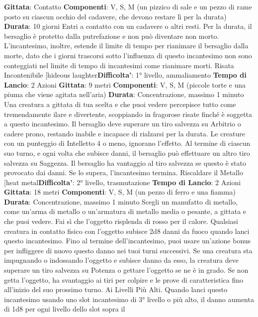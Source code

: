 \begin{multicols}{2}
\textbf{Gittata}: Contatto
\textbf{Componenti}: V, S, M (un pizzico di sale e un pezzo di
rame posto su ciascun occhio del cadavere, che
devono restare lì per la durata)
\textbf{Durata}: 10 giorni
Entri a contatto con un cadavere o altri resti. Per la
durata, il bersaglio è protetto dalla putrefazione e non
può diventare non morto.
L’incantesimo, inoltre, estende il limite di tempo per
rianimare il bersaglio dalla morte, dato che i giorni
trascorsi sotto l’influenza di questo incantesimo non 
sono conteggiati nel limite di tempo di incantesimi come
rianimare morti.
Risata Incontenibile
[hideous laughter\textbf{Difficolta'}:
1° livello, ammaliamento
\textbf{Tempo di Lancio}: 2 Azioni
\textbf{Gittata}: 9 metri
\textbf{Componenti}: V, S, M (piccole torte e una piuma che
viene agitata nell’aria)
\textbf{Durata}: Concentrazione, massimo 1 minuto
Una creatura a gittata di tua scelta e che puoi vedere
percepisce tutto come tremendamente ilare e
divertente, scoppiando in fragorose risate finché è
soggetta a questo incantesimo. Il bersaglio deve
superare un tiro salvezza su Arbitrio o cadere prono,
restando inabile e incapace di rialzarsi per la durata. Le
creature con un punteggio di Intelletto 4 o meno,
ignorano l’effetto.
Al termine di ciascun suo turno, e ogni volta che
subisce danni, il bersaglio può effettuare un altro tiro
salvezza su Saggezza. Il bersaglio ha vantaggio al tiro
salvezza se questo è stato provocato dai danni. Se lo
supera, l’incantesimo termina.
Riscaldare il Metallo
[heat metal\textbf{Difficolta'}:
2° livello, trasmutazione
\textbf{Tempo di Lancio}: 2 Azioni
\textbf{Gittata}: 18 metri
\textbf{Componenti}: V, S, M (un pezzo di ferro e una fiamma)
\textbf{Durata}: Concentrazione, massimo 1 minuto
Scegli un manufatto di metallo, come un’arma di
metallo o un’armatura di metallo media o pesante, a
gittata e che puoi vedere. Fai sì che l’oggetto risplenda
di rosso per il calore. Qualsiasi creatura in contatto
fisico con l’oggetto subisce 2d8 danni da fuoco quando
lanci questo incantesimo. Fino al termine
dell’incantesimo, puoi usare un’azione bonus per
infliggere di nuovo questo danno nei tuoi turni
successivi.
Se una creatura sta impugnando o indossando l’oggetto
e subisce danno da esso, la creatura deve superare un
tiro salvezza su Potenza o gettare l’oggetto se ne è
in grado. Se non getta l’oggetto, ha svantaggio ai tiri per
colpire e le prove di caratteristica fino all’inizio del suo
prossimo turno.
Ai Livelli Più Alti. Quando lanci questo incantesimo
usando uno slot incantesimo di 3° livello o più alto, il
danno aumenta di 1d8 per ogni livello dello slot sopra il

\end{multicols}
